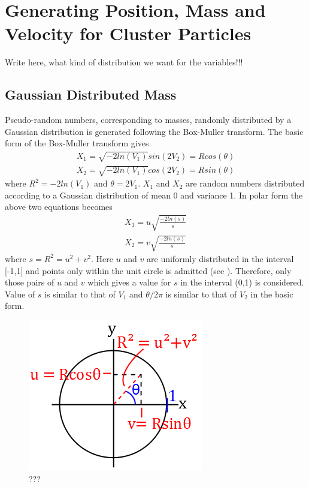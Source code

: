\section{Generating Position, Mass and Velocity for Cluster Particles}
\label{Method:GeneratingPosMassVel}
Write here, what kind of distribution we want for the variables!!!
\subsection{Gaussian Distributed Mass}

Pseudo-random numbers, corresponding to masses, randomly distributed by a Gaussian distribution is generated following the Box-Muller transform. 
The basic form of the Box-Muller transform gives
\begin{align*}
	X_1 = \sqrt{-2ln(V_1)}sin(2V_2)=Rcos(\theta)
	\\
	X_2 = \sqrt{-2ln(V_1)}cos(2V_2)=Rsin(\theta)
\end{align*}
where $R ^2 = -2ln(V_1)$ and $\theta =2V_1$.
$X_1$ and $X_2$ are random numbers distributed according to a Gaussian distribution of mean 0 and variance 1.
In polar form the above two equations becomes
\begin{align*}
	X_1 = 
	u \sqrt{\frac{-2 ln(s)}{s}}
	\\
	X_2 = 
	v \sqrt{\frac{-2 ln(s)}{s}}
\end{align*}
where $s = R^2 = u^2 + v^2$. 
Here $u$ and $v$ are uniformly distributed in the interval [-1,1] and points only within the unit circle is admitted (see ). 
Therefore, only those pairs of $u$ and $v$ which gives a value for $s$ in the interval (0,1) is considered. 
Value of $s$ is similar to that of $V_1$ and $\theta/2\pi$ is similar to that of $V_2$ in the basic form.
\begin{figure}[H]
\centering
	\includegraphics[width=0.4\linewidth]{Figures/Gaussian_mass_generation_ill.png}
\caption{
???
}
\label{fig:Gaussian_mass_generation_ill}
\end{figure}
